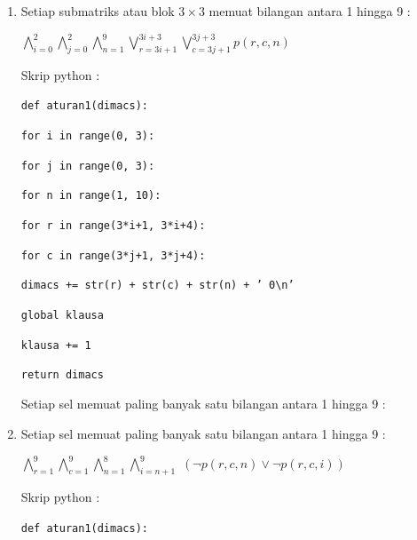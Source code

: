 \begin{enumerate}
	\item Setiap submatriks atau blok $3 \times 3$
	memuat bilangan antara 1 hingga 9 : 
	
	$\bigwedge_{i=0}^{2}$$\bigwedge_{j=0}^{2}$$\bigwedge_{n=1}^{9}$$\bigvee_{r=3i+1}^{3i+3}$$\bigvee_{c=3j+1}^{3j+3}$$p\left(r,c,n\right)$
	
	
	\vspace{5mm}
	
	Skrip python :
	
	\vspace{5mm}
	
	\texttt{def aturan1(dimacs):}
	
	\qquad \qquad\texttt{for i in range(0, 3):}
	
	\qquad \qquad \qquad\texttt{for j in range(0, 3):}
	
	\qquad \qquad \qquad \qquad\texttt{for n in range(1, 10):}
	
	\qquad\qquad\qquad\qquad\qquad\texttt{for r in range(3*i+1, 3*i+4):}
	
	\qquad\qquad\qquad\qquad\qquad\qquad\texttt{for c in range(3*j+1, 3*j+4):}
	
	\qquad\qquad\qquad\qquad\qquad\qquad\qquad\texttt{dimacs += str(r) + str(c) + str(n) + ' 0\textbackslash n'}
	
	\qquad\qquad\qquad\qquad\qquad\qquad\texttt{global klausa}
	
	\qquad\qquad\qquad\qquad\qquad\qquad\texttt{klausa += 1}
	
	\qquad\qquad\texttt{return dimacs}
	
	\vspace{5mm}
	
	Setiap sel memuat paling banyak satu bilangan antara 1 hingga 9 : 
	
	\vspace{5mm}
	
	
	\item Setiap sel memuat paling banyak satu bilangan antara 1 hingga 9 : 
	
	$\bigwedge_{r=1}^{9}$$\bigwedge_{c=1}^{9}$$\bigwedge_{n=1}^{8}$$\bigwedge_{i=n+1}^{9}$
	$\left(\neg p\left(r,c,n\right)\vee\neg p\left(r,c,i\right)\right)$
	
	
	\vspace{5mm}
	
	Skrip python :
	
	\vspace{5mm}
	
	\texttt{def aturan1(dimacs):}
	

\end{enumerate}
